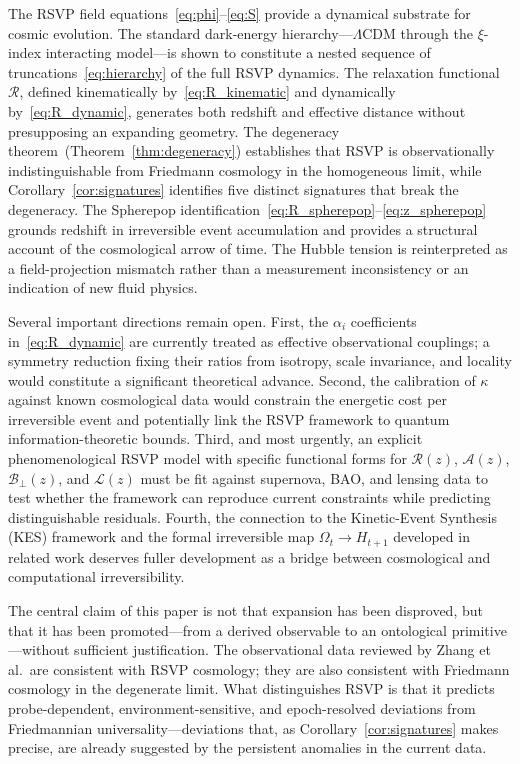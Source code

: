 \documentclass[12pt,a4paper]{article}
\theoremstyle{remark}
\newcommand{\Rcal}{\mathcal{R}}
\newcommand{\Acal}{\mathcal{A}}
\newcommand{\Bcal}{\mathcal{B}}
\begin{document}
The RSVP field equations~\eqref{eq:phi}--\eqref{eq:S} provide a dynamical substrate for cosmic evolution. The standard dark-energy hierarchy---$\Lambda$CDM through the $\xi$-index interacting model---is shown to constitute a nested sequence of truncations~\eqref{eq:hierarchy} of the full RSVP dynamics. The relaxation functional $\Rcal$, defined kinematically by~\eqref{eq:R_kinematic} and dynamically by~\eqref{eq:R_dynamic}, generates both redshift and effective distance without presupposing an expanding geometry. The degeneracy theorem~(Theorem~\ref{thm:degeneracy}) establishes that RSVP is observationally indistinguishable from Friedmann cosmology in the homogeneous limit, while Corollary~\ref{cor:signatures} identifies five distinct signatures that break the degeneracy. The Spherepop identification~\eqref{eq:R_spherepop}--\eqref{eq:z_spherepop} grounds redshift in irreversible event accumulation and provides a structural account of the cosmological arrow of time. The Hubble tension is reinterpreted as a field-projection mismatch rather than a measurement inconsistency or an indication of new fluid physics.

Several important directions remain open. First, the $\alpha_i$ coefficients in~\eqref{eq:R_dynamic} are currently treated as effective observational couplings; a symmetry reduction fixing their ratios from isotropy, scale invariance, and locality would constitute a significant theoretical advance. Second, the calibration of $\kappa$ against known cosmological data would constrain the energetic cost per irreversible event and potentially link the RSVP framework to quantum information-theoretic bounds. Third, and most urgently, an explicit phenomenological RSVP model with specific functional forms for $\Rcal(z)$, $\Acal(z)$, $\Bcal_\perp(z)$, and $\mathcal{L}(z)$ must be fit against supernova, BAO, and lensing data to test whether the framework can reproduce current constraints while predicting distinguishable residuals. Fourth, the connection to the Kinetic-Event Synthesis (KES) framework and the formal irreversible map $\Omega_t \to H_{t+1}$ developed in related work deserves fuller development as a bridge between cosmological and computational irreversibility.

The central claim of this paper is not that expansion has been disproved, but that it has been promoted---from a derived observable to an ontological primitive---without sufficient justification. The observational data reviewed by Zhang et al.\ are consistent with RSVP cosmology; they are also consistent with Friedmann cosmology in the degenerate limit. What distinguishes RSVP is that it predicts probe-dependent, environment-sensitive, and epoch-resolved deviations from Friedmannian universality---deviations that, as Corollary~\ref{cor:signatures} makes precise, are already suggested by the persistent anomalies in the current data.
\end{document}
